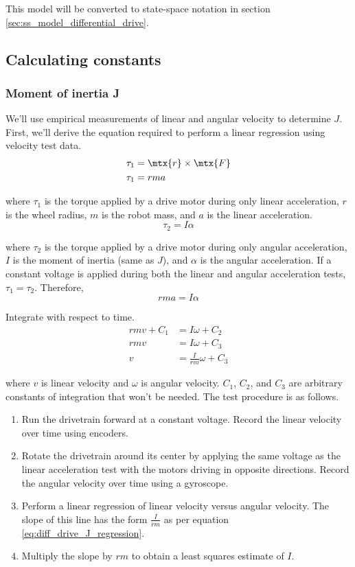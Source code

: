 This model will be converted to state-space notation in section
\ref{sec:ss_model_differential_drive}.

\subsection{Calculating constants}

\subsubsection{Moment of inertia J}

We'll use empirical measurements of linear and angular velocity to determine
$J$. First, we'll derive the equation required to perform a linear regression
using velocity test data.
\begin{align*}
  \tau_1 &= \mtx{r} \times \mtx{F} \\
  \tau_1 &= rma
\end{align*}

where $\tau_1$ is the torque applied by a drive motor during only linear
acceleration, $r$ is the wheel radius, $m$ is the robot mass, and $a$ is the
linear acceleration.
\begin{equation*}
  \tau_2 = I \alpha
\end{equation*}

where $\tau_2$ is the torque applied by a drive motor during only angular
acceleration, $I$ is the moment of inertia (same as $J$), and $\alpha$ is the
angular acceleration. If a constant voltage is applied during both the linear
and angular acceleration tests, $\tau_1 = \tau_2$. Therefore,
\begin{equation*}
  rma = I \alpha
\end{equation*}

Integrate with respect to time.
\begin{align}
  rmv + C_1 &= I \omega + C_2 \nonumber \\
  rmv &= I \omega + C_3 \nonumber \\
  v &= \frac{I}{rm} \omega + C_3 \label{eq:diff_drive_J_regression}
\end{align}

where $v$ is linear velocity and $\omega$ is angular velocity. $C_1$, $C_2$, and
$C_3$ are arbitrary constants of integration that won't be needed. The test
procedure is as follows.
\begin{enumerate}
  \item Run the drivetrain forward at a constant voltage. Record the linear
    velocity over time using encoders.
  \item Rotate the drivetrain around its center by applying the same voltage as
    the linear acceleration test with the motors driving in opposite directions.
    Record the angular velocity over time using a gyroscope.
  \item Perform a linear regression of linear velocity versus angular velocity.
    The slope of this line has the form $\frac{I}{rm}$ as per equation
    \eqref{eq:diff_drive_J_regression}.
  \item Multiply the slope by $rm$ to obtain a least squares estimate of $I$.
\end{enumerate}
